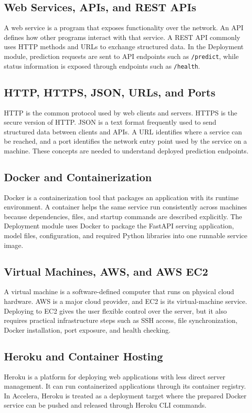 \documentclass[12pt,a4paper]{report}
\begin{document}
\subsection{Web Services, APIs, and REST APIs}
A web service is a program that exposes functionality over the network. An API
defines how other programs interact with that service. A REST API commonly uses
HTTP methods and URLs to exchange structured data. In the Deployment module,
prediction requests are sent to API endpoints such as \texttt{/predict}, while
status information is exposed through endpoints such as \texttt{/health}.

\subsection{HTTP, HTTPS, JSON, URLs, and Ports}
HTTP is the common protocol used by web clients and servers. HTTPS is the secure
version of HTTP. JSON is a text format frequently used to send structured data
between clients and APIs. A URL identifies where a service can be reached, and
a port identifies the network entry point used by the service on a machine.
These concepts are needed to understand deployed prediction endpoints.

\subsection{Docker and Containerization}
Docker is a containerization tool that packages an application with its runtime
environment. A container helps the same service run consistently across
machines because dependencies, files, and startup commands are described
explicitly. The Deployment module uses Docker to package the FastAPI serving
application, model files, configuration, and required Python libraries into one
runnable service image.

\subsection{Virtual Machines, AWS, and AWS EC2}
A virtual machine is a software-defined computer that runs on physical cloud
hardware. AWS is a major cloud provider, and EC2 is its virtual-machine service.
Deploying to EC2 gives the user flexible control over the server, but it also
requires practical infrastructure steps such as SSH access, file
synchronization, Docker installation, port exposure, and health checking.

\subsection{Heroku and Container Hosting}
Heroku is a platform for deploying web applications with less direct server
management. It can run containerized applications through its container
registry. In Accelera, Heroku is treated as a deployment target where the
prepared Docker service can be pushed and released through Heroku CLI commands.
\end{document}
